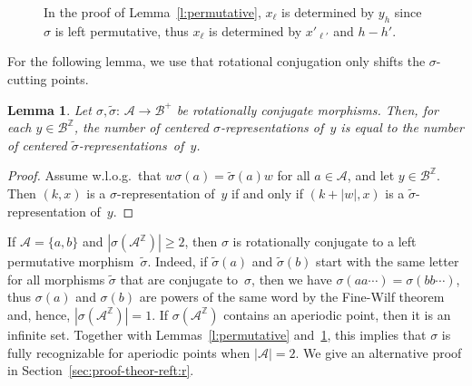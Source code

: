 \documentclass{amsart}
\newtheorem{lemma}{Lemma}[section]
\theoremstyle{definition}
\theoremstyle{remark}
\numberwithin{equation}{section}
\begin{document}
\begin{figure}[ht]
\caption{In the proof of Lemma~\ref{l:permutative}, $x_\ell$ is determined by $y_h$ since $\sigma$ is left permutative, thus $x_\ell$ is determined by $x'_{\ell'}$ and $h-h'$.} \label{f:permutative}
\end{figure}
 
For the following lemma, we use that rotational conjugation only shifts the $\sigma$-cutting points. 

\begin{lemma} \label{l:conjugaterecognizable}
Let $\sigma, \tilde{\sigma}:\, \mathcal{A} \to \mathcal{B}^+$ be rotationally conjugate morphisms.
Then, for each $y \in \mathcal{B}^\mathbb{Z}$, the number of centered $\sigma$-representations of~$y$ is equal to the number of centered $\tilde{\sigma}$-representations~of~$y$.
\end{lemma}

\begin{proof}
Assume w.l.o.g.\ that $w \sigma(a) = \tilde{\sigma}(a) w$ for all $a \in \mathcal{A}$, and let $y \in \mathcal{B}^\mathbb{Z}$. 
Then $(k,x)$ is a $\sigma$-representation of~$y$ if and only if $(k+|w|,x)$ is a $\tilde{\sigma}$-representation of~$y$.
\end{proof}

If $\mathcal{A} = \{a,b\}$ and $|\sigma(\mathcal{A}^\mathbb{Z})| \ge 2$, then $\sigma$ is rotationally conjugate to a left permutative morphism~$\tilde{\sigma}$. 
Indeed, if $\tilde{\sigma}(a)$ and $\tilde{\sigma}(b)$ start with the same letter for all morphisms $\tilde{\sigma}$ that are conjugate to~$\sigma$, then we have $\sigma(aa\cdots) = \sigma(bb\cdots)$, thus $\sigma(a)$ and $\sigma(b)$ are powers of the same word by the Fine-Wilf theorem \cite{Fine:65} and, hence, $|\sigma(\mathcal{A}^\mathbb{Z})| = 1$.
If $\sigma(\mathcal{A}^\mathbb{Z})$ contains an aperiodic point, then it is an infinite set.
Together with Lemmas~\ref{l:permutative} and~\ref{l:conjugaterecognizable}, this implies that $\sigma$ is fully recognizable for aperiodic points when $|\mathcal{A}| = 2$.
We give an alternative proof in Section~\ref{sec:proof-theor-reft:r}.
\end{document}
